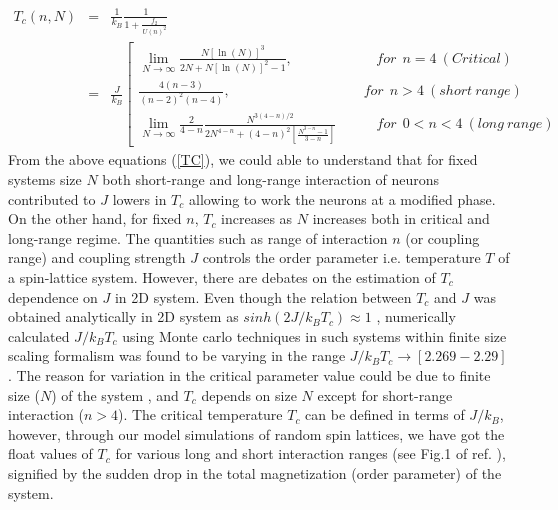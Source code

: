 \documentclass[preprintnumbers,amsmath,amssymb,onecolumn]{revtex4}
\begin{document}
\begin{eqnarray}
\label{TC}
T_c(n,N)&=&\frac{1}{k_B}\frac{1}{1+\frac{f_2}{U(n)^2}}\nonumber\\
&=&\frac{J}{k_B}\left[
\begin{matrix}
\lim_{N\rightarrow\infty}\frac{N[\ln(N)]^3}{2N+N[\ln(N)]^2-1},~~~~~~~~~~~~~~~~~~~~~~~~~~~for~~n=4~(Critical)~~~~~~~~~~\\
\frac{4(n-3)}{(n-2)^2(n-4)},~~~~~~~~~~~~~~~~~~~~~~~~~~~~~~~~~~~~~~~~~~~for~~n>4~(short~range)~~~~~\\
\lim_{N\rightarrow\infty}\frac{2}{4-n}
\frac{N^{3(4-n)/2}}{2N^{4-n}+(4-n)^2\left[\frac{N^{3-n}-1}{3-n}\right]}~~~~~~~~~~~~~for~~0<n<4~(long~range)~~
\end{matrix}
\right.
\end{eqnarray}
From the above equations  (\ref{TC}), we could able to understand that for fixed systems size $N$ both short-range and long-range interaction of neurons contributed to $J$ lowers in $T_c$ allowing to work the neurons at a modified phase. On the other hand, for fixed $n$, $T_c$ increases as $N$ increases both in critical and long-range regime. The quantities such as range of interaction $n$ (or coupling range) and coupling strength $J$ controls the order parameter i.e. temperature $T$ of a spin-lattice system. However, there are debates on the estimation of $T_c$ dependence on $J$ in 2D system. Even though the relation between $T_c$ and $J$ was obtained analytically in 2D system as $sinh(2J/k_BT_c)\approx 1$ \citep{onsager1944}, numerically calculated $J/k_BT_c$ using Monte carlo techniques in such systems within finite size scaling formalism was found to be varying in the range $J/k_BT_c\rightarrow [2.269-2.29]$ \citep{Binder1988}. The reason for variation in the critical parameter value could be due to finite size ($N$) of the system \citep{Binder1988}, and $T_c$ depends on size $N$ except for short-range interaction ($n>4$). The critical temperature $T_c$ can be defined in terms of $J/k_B$, however, through our model simulations of random spin lattices, we have got the float values of $T_c$ for various long and short interaction ranges (see Fig.1 of ref. \citep{Gundh2015}), signified by the sudden drop in the total magnetization (order parameter) of the system.\\
\end{document}
